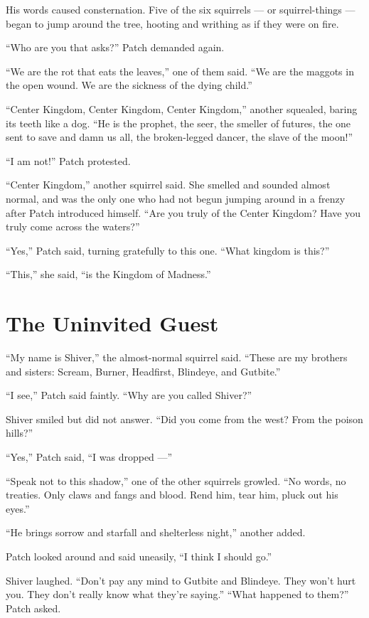 \documentclass[12pt]{memoir}
\begin{document}
His words caused consternation. Five of the six squirrels — or
squirrel-things — began to jump around the tree, hooting and writhing
as if they were on fire.

“Who are you that asks?” Patch demanded again.

“We are the rot that eats the leaves,” one of them said. “We are the
maggots in the open wound. We are the sickness of the dying child.”

“Center Kingdom, Center Kingdom, Center Kingdom,” another squealed,
baring its teeth like a dog. “He is the prophet, the seer, the smeller
of futures, the one sent to save and damn us all, the broken-legged
dancer, the slave of the moon!”

“I am not!” Patch protested.

“Center Kingdom,” another squirrel said. She smelled and sounded
almost normal, and was the only one who had not begun jumping around
in a frenzy after Patch introduced himself. “Are you truly of the
Center Kingdom? Have you truly come across the waters?”

“Yes,” Patch said, turning gratefully to this one. “What kingdom is
this?”

“This,” she said, “is the Kingdom of Madness.”


\section{The Uninvited Guest}

“My name is Shiver,” the almost-normal squirrel said. “These are my
brothers and sisters: Scream, Burner, Headfirst, Blindeye, and
Gutbite.”

“I see,” Patch said faintly. “Why are you called Shiver?”

Shiver smiled but did not answer. “Did you come from the west? From
the poison hills?”

“Yes,” Patch said, “I was dropped —”

“Speak not to this shadow,” one of the other squirrels growled. “No
words, no treaties. Only claws and fangs and blood. Rend him, tear
him, pluck out his eyes.”

“He brings sorrow and starfall and shelterless night,” another added.

Patch looked around and said uneasily, “I think I should go.”

Shiver laughed. “Don’t pay any mind to Gutbite and Blindeye. They
won’t hurt you. They don’t really know what they’re saying.” “What
happened to them?” Patch asked.
\end{document}
